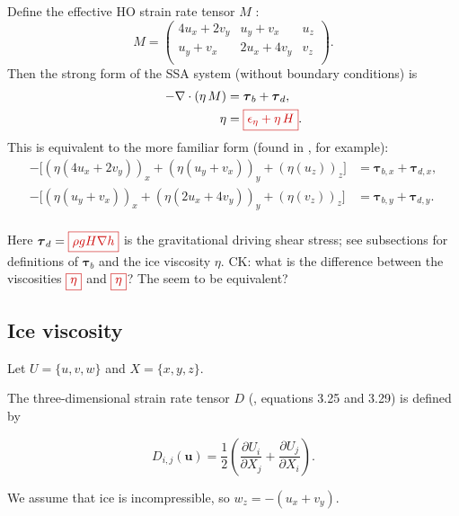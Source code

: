 \documentclass{amsart}
\newcommand{\U}{\mathbf{u}}
\newcommand{\T}{\boldsymbol{\tau}}
\newcommand{\diff}[2]{\ensuremath{\frac{\partial #1}{\partial #2}}}
\newcommand{\basalshearstress}[1]{\T_{b#1}}
\newcommand{\taub}{\basalshearstress{}}
\newcommand{\taubx}{\basalshearstress{,x}}
\newcommand{\tauby}{\basalshearstress{,y}}
\newcommand{\drivingstress}[1]{\T_{d#1}}
\newcommand{\taud}{\drivingstress{}}
\newcommand{\taudx}{\drivingstress{,x}}
\newcommand{\taudy}{\drivingstress{,y}}
\newcommand{\highlight}[1]{{\color{red!80!black} \fbox{$ \displaystyle #1 $} }}
\begin{document}
\newcommand{\Mux}{4u_x + 2v_y}
\newcommand{\Muy}{u_y + v_x}
\newcommand{\Muz}{u_z}
\newcommand{\Mvx}{u_y + v_x}
\newcommand{\Mvy}{2u_x + 4v_y}
\newcommand{\Mvz}{v_z}

Define the effective HO strain rate tensor $M$ \cite{DiasDosSantos2022}:
\begin{equation}
  \label{eq:1}
  M =
    \begin{pmatrix}
      \Mux & \Muy & \Muz\\
      \Mvx & \Mvy & \Mvz\\
    \end{pmatrix}.
\end{equation}
Then the strong form of the SSA system (without boundary conditions) is
\begin{align}
  \label{eq:2}
  - \nabla\cdot(\eta\, M) & = \taub + \taud,\\
  \label{eq:3}
  \eta &= \highlight{ \epsilon_{\eta} + \eta\, H }.
\end{align}
This is equivalent to the more familiar form (found in \cite{SchoofStream}, for example):
\begin{align*}
 - \Big[ (\eta (\Mux))_x + (\eta (\Muy))_y + (\eta(\Muz))_z \Big] & = \taubx + \taudx, \\
 - \Big[ (\eta (\Mvx))_x + (\eta (\Mvy))_y + (\eta(\Mvz))_z \Big] & = \tauby + \taudy.\\
\end{align*}

Here $\taud = \highlight{ \rho g H \nabla h }$ is the gravitational driving shear stress; see subsections for definitions of $\taub$ and the ice viscosity $\eta$. CK: what is the difference between the viscosities $\highlight{\eta}$ and $\highlight{\eta}$? The seem to be equivalent?


\subsection{Ice viscosity}
\label{sec:ice-viscosity}

Let $U = \{u,v,w\}$ and $X = \{x, y, z\}$.

The three-dimensional strain rate tensor $D$ (\cite{GreveBlatter2009}, equations 3.25 and 3.29) is defined by

\begin{equation*}
  D_{i,j}(\U) = \frac 12 \left( \diff{U_i}{X_j} + \diff{U_j}{X_i} \right).
\end{equation*}

We assume that ice is incompressible, so $w_z = - (u_x + v_y)$.
\end{document}
